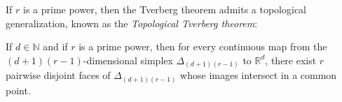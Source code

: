 \documentclass[english,a4paper,nolineno]{lipics-v2019}
\newcommand{\R}{\mathbb{R}}
\begin{document}
If $r$ is a prime power, then the Tverberg theorem admits a topological generalization, known as the \emph{Topological Tverberg theorem}:
\begin{theorem} 
\label{thm:topTverberg}
If $d\in \mathbb{N}$ and if $r$ is a prime power, then for every continuous map from the $(d+1)(r-1)$-dimensional simplex $\Delta_{(d+1)(r-1)}$ to $\R^d$, there exist $r$ pairwise disjoint faces of $\Delta_{(d+1)(r-1)}$ whose images intersect in a common point. 
\end{theorem}
\end{document}
